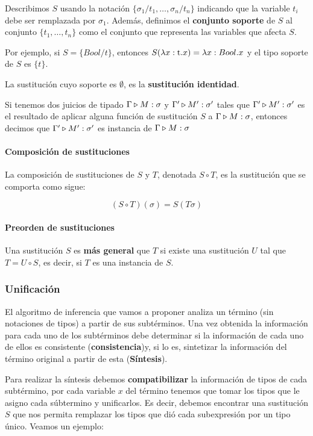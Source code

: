 Describimos $S$ usando la notación $\{\sigma_1/t_1,\dots,\sigma_n/t_n\}$ indicando que la variable $t_i$ debe ser remplazada por $\sigma_1$. Además, definimos el \textbf{conjunto soporte} de $S$ al conjunto $\{t_1,\dots,t_n\}$ como el conjunto que representa las variables que afecta $S$.

Por ejemplo, si $S = \{  Bool/t \}$, entonces $S(\lambda x: \text{t} . x) = \lambda x:  Bool . x$ y el tipo soporte de $S$ es $\{t\}$.

La sustitución cuyo soporte es $\emptyset$, es la \textbf{sustitución identidad}.


\hspace*{5mm}
Si tenemos dos juicios de tipado $\Gamma\triangleright M : \sigma$ y $\Gamma'\triangleright M' : \sigma'$ tales que $\Gamma'\triangleright M' : \sigma'$ es el resultado de aplicar alguna función de sustitución $S$ a $\Gamma\triangleright M : \sigma$, entonces decimos que $\Gamma'\triangleright M' : \sigma'$ es instancia de $\Gamma\triangleright M : \sigma$

\paragraph{Composición de sustituciones} La composición de sustituciones de $S$ y $T$, denotada $S\circ T$, es la sustitución que se comporta como sigue:

$$(S\circ T)(\sigma) = S(T\sigma)$$

\paragraph{Preorden de sustituciones} Una sustitución $S$ es \textbf{más general} que $T$ si existe una sustitución $U$ tal que $T = U\circ S$, es decir, si $T$ es una instancia de $S$.


\subsubsection{Unificación}
El algoritmo de inferencia que vamos a proponer analiza un término (sin notaciones de tipos) a partir de sus subtérminos. Una vez obtenida la información para cada uno de los subtérminos debe determinar si la información de cada uno de ellos es consistente (\textbf{consistencia})y, si lo es, sintetizar la información del término original a partir de esta (\textbf{Síntesis}).

Para realizar la síntesis debemos \textbf{compatibilizar} la información de tipos de cada subtérmino, por cada variable $x$ del término tenemos que tomar los tipos que le asigno cada súbtermino y unificarlos. Es decir, debemos encontrar una sustitución $S$ que nos permita remplazar los tipos que dió cada subexpresión por un tipo único. Veamos un ejemplo:

